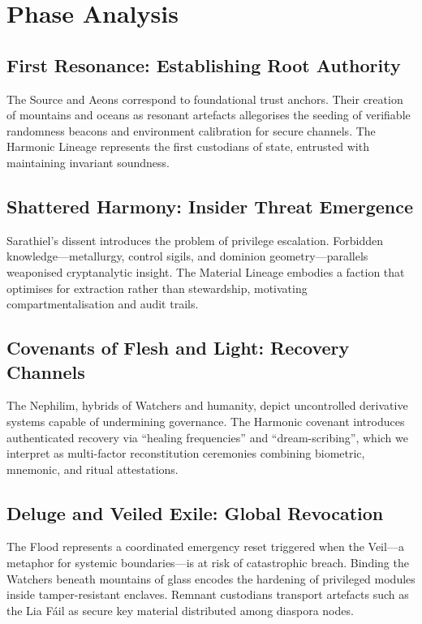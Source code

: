 \documentclass[submission]{iacrtrans}
\begin{document}
\section{Phase Analysis}
\subsection{First Resonance: Establishing Root Authority}
The Source and Aeons correspond to foundational trust anchors.
Their creation of mountains and oceans as resonant artefacts allegorises the seeding of verifiable randomness beacons and environment calibration for secure channels.
The Harmonic Lineage represents the first custodians of state, entrusted with maintaining invariant soundness.

\subsection{Shattered Harmony: Insider Threat Emergence}
Sarathiel's dissent introduces the problem of privilege escalation.
Forbidden knowledge---metallurgy, control sigils, and dominion geometry---parallels weaponised cryptanalytic insight.
The Material Lineage embodies a faction that optimises for extraction rather than stewardship, motivating compartmentalisation and audit trails.

\subsection{Covenants of Flesh and Light: Recovery Channels}
The Nephilim, hybrids of Watchers and humanity, depict uncontrolled derivative systems capable of undermining governance.
The Harmonic covenant introduces authenticated recovery via ``healing frequencies'' and ``dream-scribing'', which we interpret as multi-factor reconstitution ceremonies combining biometric, mnemonic, and ritual attestations.

\subsection{Deluge and Veiled Exile: Global Revocation}
The Flood represents a coordinated emergency reset triggered when the Veil---a metaphor for systemic boundaries---is at risk of catastrophic breach.
Binding the Watchers beneath mountains of glass encodes the hardening of privileged modules inside tamper-resistant enclaves.
Remnant custodians transport artefacts such as the Lia F\'ail as secure key material distributed among diaspora nodes.
\end{document}
